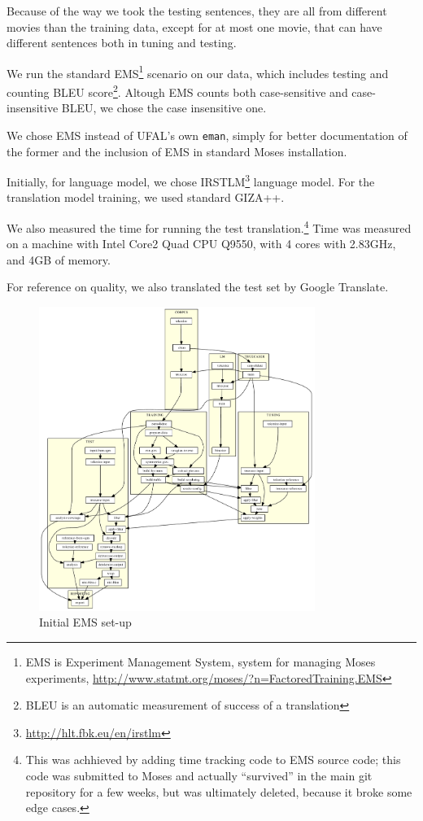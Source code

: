 Because of the way we took the testing sentences, they are all from different movies than the training data, except for at most one movie, that can have different sentences both in tuning and testing.

We run the standard EMS\footnote{EMS is Experiment Management System, system for managing Moses experiments, \url{http://www.statmt.org/moses/?n=FactoredTraining.EMS}} scenario on our data, which includes testing and counting BLEU score\footnote{BLEU is an automatic measurement of success of a translation}. Altough EMS counts both case-sensitive and case-insensitive BLEU, we chose the case insensitive one.

 We chose EMS instead of UFAL's own \texttt{eman}, simply for better documentation of the former and the inclusion of EMS in standard Moses installation.

Initially, for language model, we chose IRSTLM\footnote{\url{http://hlt.fbk.eu/en/irstlm}} language model. For the translation model training, we used standard GIZA++.

We also measured the time for running the test translation.\footnote{This was achhieved by adding time tracking code to EMS source code; this code was submitted to Moses and actually ``survived'' in the main git repository for a few weeks, but was ultimately deleted, because it broke some edge cases.} Time was measured on a machine with Intel Core2 Quad CPU Q9550, with 4 cores with 2.83GHz, and 4GB of memory.

For reference on quality, we also translated the test set by Google Translate.

\begin{figure}[h]
\begin{center}
\includegraphics[width=0.8\textwidth]{figures/moses_13_graf.pdf}
\end{center}
\caption{Initial EMS set-up}\label{moses:initial}
\end{figure}

